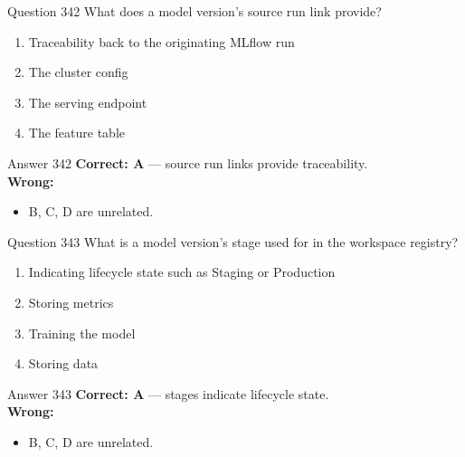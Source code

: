 \documentclass[aspectratio=169,11pt]{beamer}
\begin{document}
	\begin{frame}{Question 342}
		What does a model version's source run link provide?
		\begin{enumerate}[label=\Alph*.]
			\item Traceability back to the originating MLflow run
			\item The cluster config
			\item The serving endpoint
			\item The feature table
		\end{enumerate}
	\end{frame}
	\begin{frame}{Answer 342}
		\textbf{Correct: A} --- source run links provide traceability.\\
		\vspace{0.5em}
		\textbf{Wrong:}
		\begin{itemize}
			\item B, C, D are unrelated.
		\end{itemize}
	\end{frame}
	
	\begin{frame}{Question 343}
		What is a model version's stage used for in the workspace registry?
		\begin{enumerate}[label=\Alph*.]
			\item Indicating lifecycle state such as Staging or Production
			\item Storing metrics
			\item Training the model
			\item Storing data
		\end{enumerate}
	\end{frame}
	\begin{frame}{Answer 343}
		\textbf{Correct: A} --- stages indicate lifecycle state.\\
		\vspace{0.5em}
		\textbf{Wrong:}
		\begin{itemize}
			\item B, C, D are unrelated.
		\end{itemize}
	\end{frame}
	
\end{document}
